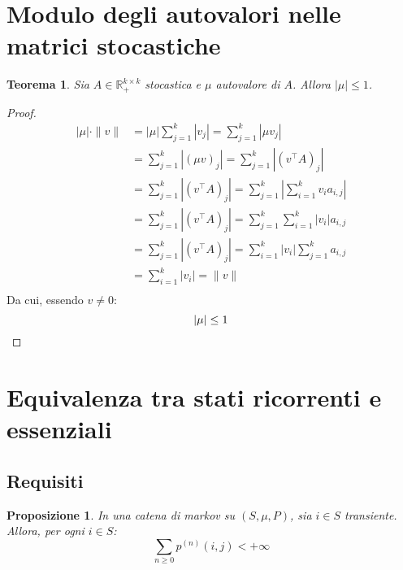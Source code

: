 \documentclass{article}
\theoremstyle{plain}
\newtheorem{thm}{Teorema}
\newtheorem{prop}{Proposizione}
\newcommand{\R}{\mathbb R}
\newcommand{\Rp}{\R_+}
\newcommand{\abs}[1]{\left|#1\right|}
\newcommand{\norm}[1]{\|#1\|}
\newcommand{\tra}{^\top}
\begin{document}
\section{Modulo degli autovalori nelle matrici stocastiche}

\begin{thm}
	Sia $A\in\Rp^{k\times k}$ stocastica e $\mu$ autovalore di $A$. Allora $\abs{\mu}\le 1$.
\end{thm}
\begin{proof}
	\begin{align*}
		\abs{\mu}\cdot\norm{v} & = \abs{\mu}\sum_{j=1}^k\abs{v_j} = \sum_{j=1}^k\abs {\mu v_j}                  \\
		                       & = \sum_{j=1}^k\abs {(\mu v)_j} = \sum_{j=1}^k\abs {(v\tra A)_j}                \\
		                       & = \sum_{j=1}^k\abs {(v\tra A)_j} = \sum_{j=1}^k\abs {\sum_{i=1}^k v_i a_{i,j}} \\
		                       & = \sum_{j=1}^k\abs {(v\tra A)_j} = \sum_{j=1}^k \sum_{i=1}^k \abs{v_i} a_{i,j} \\
		                       & = \sum_{j=1}^k\abs {(v\tra A)_j} = \sum_{i=1}^k \abs{v_i} \sum_{j=1}^k a_{i,j} \\
		                       & = \sum_{i=1}^k \abs{v_i} = \norm{v}                                            \\
	\end{align*}
	Da cui, essendo $v\neq 0$:
	\begin{equation*}
		\abs{\mu}\leq 1 \qedhere
	\end{equation*}
\end{proof}




\section{Equivalenza tra stati ricorrenti e essenziali}


\subsection{Requisiti}
\begin{prop}\label{prop:sumtrans}
	In una catena di markov su $(S,\mu,P)$, sia $i\in S$ transiente. Allora, per ogni $i\in S$:
	\begin{equation*}
		\sum_{n\ge0}p^{(n)}(i,j)<+\infty
	\end{equation*}
\end{prop}
\end{document}
